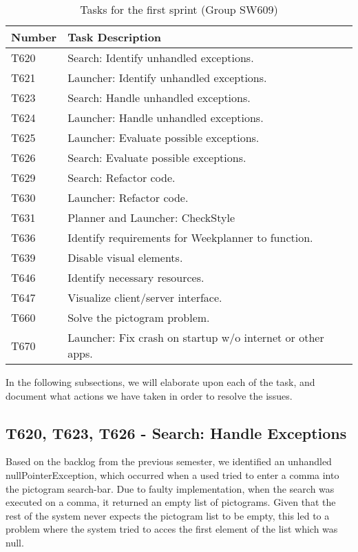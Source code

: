 \begin{table}[H]
\centering
\begin{tabular}{|l|l|}
\hline
Number 			& Task Description 											\\\hline
T620  			& Search: Identify unhandled exceptions.                 	\\\hline
T621    	   	& Launcher: Identify unhandled exceptions. 					\\\hline 
T623	       	& Search: Handle unhandled exceptions.                 		\\\hline
T624    	   	& Launcher: Handle unhandled exceptions.  					\\\hline
T625   	   		& Launcher: Evaluate possible exceptions.        			\\\hline
T626   	   		& Search: Evaluate possible exceptions.                		\\\hline
T629  	   		& Search: Refactor code.			   						\\\hline
T630       		& Launcher: Refactor code.                 					\\\hline
T631       		& Planner and Launcher: CheckStyle                 			\\\hline
T636       		& Identify requirements for Weekplanner to function.   		\\\hline 
T639       		& Disable visual elements.                 					\\\hline
T646       		& Identify necessary resources.                 			\\\hline
T647       		& Visualize client/server interface.                 		\\\hline 
T660       		& Solve the pictogram problem.                 				\\\hline
T670       		& Launcher: Fix crash on startup w/o internet or other apps.\\\hline
\end{tabular}
\label{S01:Tasks}  
\caption{Tasks for the first sprint (Group SW609)}
\end{table}

In the following subsections, we will elaborate upon each of the task, and
document what actions we have taken in order to resolve the issues.

\subsection{T620, T623, T626 - Search: Handle Exceptions}
Based on the backlog from the previous semester, we identified an unhandled
nullPointerException, which occurred when a used tried to enter a comma into the
pictogram search-bar. Due to faulty implementation, when the search was executed
on a comma, it returned an empty list of pictograms. Given that the rest of the
system never expects the pictogram list to be empty, this led to a problem where
the system tried to acces the first element of the list which was null.\nl

